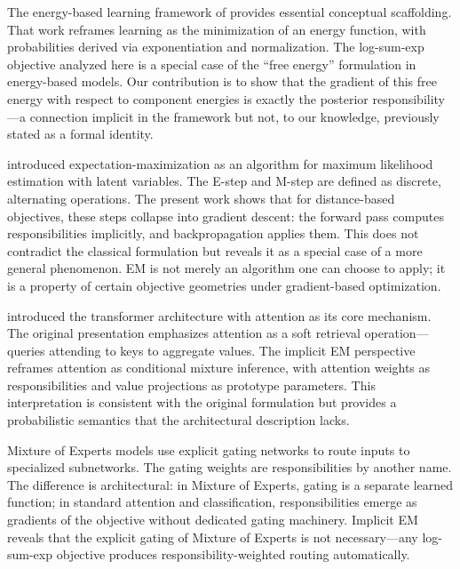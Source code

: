 The energy-based learning framework of \citet{lecun2006tutorial} provides essential conceptual scaffolding. That work reframes learning as the minimization of an energy function, with probabilities derived via exponentiation and normalization. The log-sum-exp objective analyzed here is a special case of the ``free energy'' formulation in energy-based models. Our contribution is to show that the gradient of this free energy with respect to component energies is exactly the posterior responsibility---a connection implicit in the framework but not, to our knowledge, previously stated as a formal identity.

\citet{dempster1977maximum} introduced expectation-maximization as an algorithm for maximum likelihood estimation with latent variables. The E-step and M-step are defined as discrete, alternating operations. The present work shows that for distance-based objectives, these steps collapse into gradient descent: the forward pass computes responsibilities implicitly, and backpropagation applies them. This does not contradict the classical formulation but reveals it as a special case of a more general phenomenon. EM is not merely an algorithm one can choose to apply; it is a property of certain objective geometries under gradient-based optimization.

\citet{vaswani2017attention} introduced the transformer architecture with attention as its core mechanism. The original presentation emphasizes attention as a soft retrieval operation---queries attending to keys to aggregate values. The implicit EM perspective reframes attention as conditional mixture inference, with attention weights as responsibilities and value projections as prototype parameters. This interpretation is consistent with the original formulation but provides a probabilistic semantics that the architectural description lacks.

Mixture of Experts models \citep{jacobs1991adaptive} use explicit gating networks to route inputs to specialized subnetworks. The gating weights are responsibilities by another name. The difference is architectural: in Mixture of Experts, gating is a separate learned function; in standard attention and classification, responsibilities emerge as gradients of the objective without dedicated gating machinery. Implicit EM reveals that the explicit gating of Mixture of Experts is not necessary---any log-sum-exp objective produces responsibility-weighted routing automatically.
